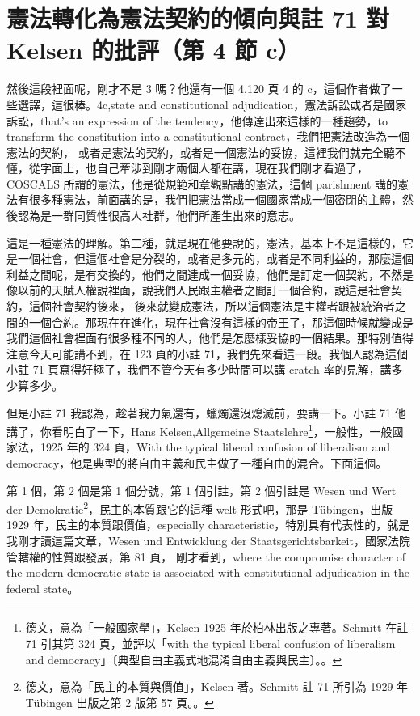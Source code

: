 \section{憲法轉化為憲法契約的傾向與註 71 對 Kelsen 的批評（第 4 節 c）}

\hypertarget{w05:cue:214}{}然後這段裡面呢，剛才不是 3 嗎？他還有一個 4,120 頁 4 的 c，這個作者做了一些選譯，這很棒。4c,state and constitutional adjudication，憲法訴訟或者是國家訴訟，that's an expression of the tendency，他傳達出來這樣的一種趨勢，to transform the constitution into a constitutional contract，我們把憲法改造為一個憲法的契約，
\hypertarget{w05:cue:215}{}或者是憲法的契約，或者是一個憲法的妥協，這裡我們就完全聽不懂，從字面上，也自己牽涉到剛才兩個人都在講，現在我們剛才看過了，COSCALS 所謂的憲法，他是從規範和章觀點講的憲法，這個 parishment 講的憲法有很多種憲法，前面講的是，我們把憲法當成一個國家當成一個密閉的主體，然後認為是一群同質性很高人社群，他們所產生出來的意志。

\hypertarget{w05:cue:216}{}這是一種憲法的理解。第二種，就是現在他要說的，憲法，基本上不是這樣的，它是一個社會，但這個社會是分裂的，或者是多元的，或者是不同利益的，那麼這個利益之間呢，是有交換的，他們之間達成一個妥協，他們是訂定一個契約，不然是像以前的天賦人權說裡面，說我們人民跟主權者之間訂一個合約，說這是社會契約，這個社會契約後來，
\hypertarget{w05:cue:217}{}後來就變成憲法，所以這個憲法是主權者跟被統治者之間的一個合約。那現在在進化，現在社會沒有這樣的帝王了，那這個時候就變成是我們這個社會裡面有很多種不同的人，他們是怎麼樣妥協的一個結果。那特別值得注意今天可能講不到，在 123 頁的小註 71，我們先來看這一段。我個人認為這個小註 71 頁寫得好極了，我們不管今天有多少時間可以講 cratch 率的見解，講多少算多少。

\hypertarget{w05:cue:218}{}但是小註 71 我認為，趁著我力氣還有，蠟燭還沒熄滅前，要講一下。小註 71 他講了，你看明白了一下，Hans Kelsen,Allgemeine Staatslehre\footnote{德文，意為「一般國家學」，Kelsen 1925 年於柏林出版之專著。Schmitt 在註 71 引其第 324 頁，並評以「with the typical liberal confusion of liberalism and democracy」〔典型自由主義式地混淆自由主義與民主〕。\cite[123]{schmitt2015}。}，一般性，一般國家法，1925 年的 324 頁，With the typical liberal confusion of liberalism and democracy，他是典型的將自由主義和民主做了一種自由的混合。下面這個。

\hypertarget{w05:cue:219}{}第 1 個，第 2 個是第 1 個分號，第 1 個引註，第 2 個引註是 Wesen und Wert der Demokratie\footnote{德文，意為「民主的本質與價值」，Kelsen 著。Schmitt 註 71 所引為 1929 年 Tübingen 出版之第 2 版第 57 頁。\cite[123]{schmitt2015}。}，民主的本質跟它的這種 welt 形式吧，那是 Tübingen，出版 1929 年，民主的本質跟價值，especially characteristic，特別具有代表性的，就是我剛才讀這篇文章，Wesen und Entwicklung der Staatsgerichtsbarkeit，國家法院管轄權的性質跟發展，第 81 頁，
\hypertarget{w05:cue:220}{}剛才看到，where the compromise character of the modern democratic state is associated with constitutional adjudication in the federal state。

